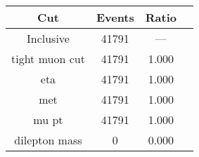 \begin{tabular}{|c||c|c|c|}
\hline
Cut & Events & Ratio\\\hline
Inclusive & 41791 & — \\
tight muon cut & 41791 & 1.000 \\
eta & 41791 & 1.000 \\
met & 41791 & 1.000 \\
mu pt & 41791 & 1.000 \\
dilepton mass & 0 & 0.000 \\
\hline
\end{tabular}
